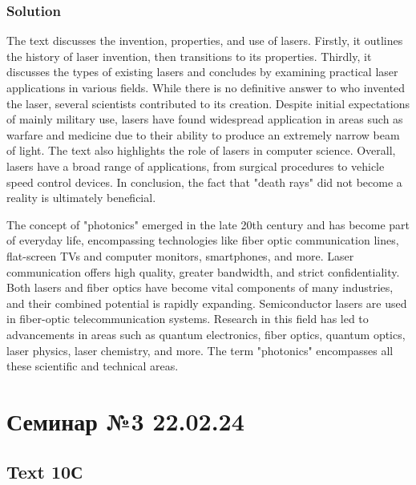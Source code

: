 \subsection*{Solution}
The text discusses the invention, properties, and use of lasers. Firstly, it outlines
the history of laser invention, then transitions to its properties. Thirdly, it
discusses the types of existing lasers and concludes by examining practical laser
applications in various fields. While there is no definitive answer to who invented
the laser, several scientists contributed to its creation. Despite initial expectations
of mainly military use, lasers have found widespread application in areas such as
warfare and medicine due to their ability to produce an extremely narrow beam of
light. The text also highlights the role of lasers in computer science. Overall,
lasers have a broad range of applications, from surgical procedures to vehicle speed
control devices. In conclusion, the fact that "death rays" did not become a reality
is ultimately beneficial.

The concept of "photonics" emerged in the late 20th century and has become part of
everyday life, encompassing technologies like fiber optic communication lines,
flat-screen TVs and computer monitors, smartphones, and more. Laser communication
offers high quality, greater bandwidth, and strict confidentiality. Both lasers and
fiber optics have become vital components of many industries, and their combined
potential is rapidly expanding. Semiconductor lasers are used in fiber-optic
telecommunication systems. Research in this field has led to advancements in areas
such as quantum electronics, fiber optics, quantum optics, laser physics, laser
chemistry, and more. The term "photonics" encompasses all these scientific and
technical areas.

\chapter{Семинар №3 22.02.24}

\section{Text 10С}

